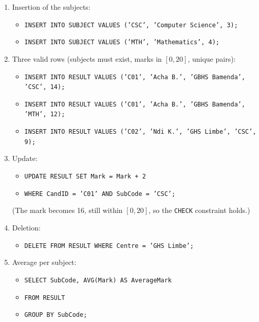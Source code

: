 \documentclass[11pt]{article}
\begin{document}
\begin{corrige}
\begin{enumerate}
\item Insertion of the subjects:
\begin{itemize}
\item \texttt{INSERT INTO SUBJECT VALUES ('CSC', 'Computer Science', 3);}
\item \texttt{INSERT INTO SUBJECT VALUES ('MTH', 'Mathematics', 4);}
\end{itemize}
\item Three valid rows (subjects must exist, marks in $[0,20]$, unique pairs):
\begin{itemize}
\item \texttt{INSERT INTO RESULT VALUES ('C01', 'Acha B.', 'GBHS Bamenda', 'CSC', 14);}
\item \texttt{INSERT INTO RESULT VALUES ('C01', 'Acha B.', 'GBHS Bamenda', 'MTH', 12);}
\item \texttt{INSERT INTO RESULT VALUES ('C02', 'Ndi K.', 'GHS Limbe', 'CSC', 9);}
\end{itemize}
\item Update:
\begin{itemize}
\item \texttt{UPDATE RESULT SET Mark = Mark + 2}
\item \texttt{WHERE CandID = 'C01' AND SubCode = 'CSC';}
\end{itemize}
(The mark becomes 16, still within $[0,20]$, so the \texttt{CHECK} constraint holds.)
\item Deletion:
\begin{itemize}
\item \texttt{DELETE FROM RESULT WHERE Centre = 'GHS Limbe';}
\end{itemize}
\item Average per subject:
\begin{itemize}
\item \texttt{SELECT SubCode, AVG(Mark) AS AverageMark}
\item \texttt{FROM RESULT}
\item \texttt{GROUP BY SubCode;}
\end{itemize}
\end{enumerate}
\end{corrige}
\end{document}

